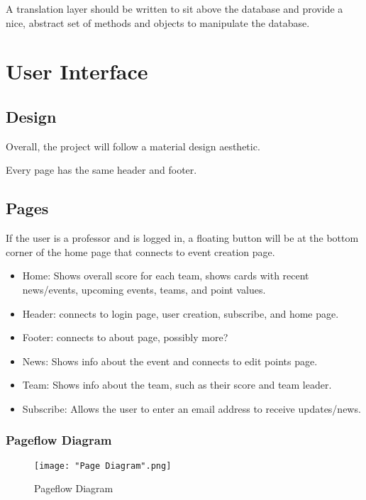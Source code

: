 \documentclass{scrreprt}
\begin{document}
    A translation layer should be written to sit above the database and provide a nice, abstract set of methods and objects to manipulate the database.
    
\chapter{User Interface}
    \section{Design}
    Overall, the project will follow a material design aesthetic.
    
    Every page has the same header and footer.
        
    \section{Pages}
    
    If the user is a professor and is logged in, a floating button will be at the bottom corner of the home page that connects to event creation page.
    
    \begin{itemize}
        \item Home: Shows overall score for each team, shows cards with recent news/events, upcoming events, teams, and point values.
        \item Header: connects to login page, user creation, subscribe, and home page. 
        \item Footer: connects to about page, possibly more?
        \item News: Shows info about the event and connects to edit points page.
        \item Team: Shows info about the team, such as their score and team leader.
        \item Subscribe: Allows the user to enter an email address to receive updates/news.
    \end{itemize}    
    
    \subsection{Pageflow Diagram}
    
\begin{figure}[H]
\caption{Pageflow Diagram}
\centering
\texttt{[image: "Page Diagram".png]}
\end{figure}    
    
\end{document}
